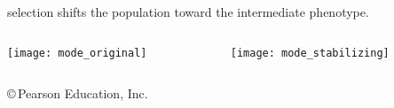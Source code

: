 \documentclass[t]{beamer}
\begin{document}
%
\begin{frame}{ selection shifts the population toward the intermediate phenotype.}
	\centering
	\begin{columns}[T]
		\begin{column}{0.5\textwidth}
			\centering
			\texttt{[image: mode\_original]}
		\end{column}
		\begin{column}{0.5\textwidth}
			\texttt{[image: mode\_stabilizing]}
		\end{column}
	\end{columns}
\end{frame}
%
{
\begin{frame}[b]{}

\tiny \copyright\,Pearson Education, Inc.
\end{frame}
}
\end{document}
